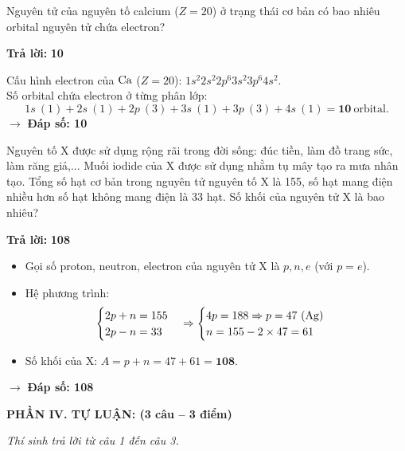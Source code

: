\documentclass[11pt,a4paper]{article}
\begin{document}
\begin{ex}%
Nguyên tử của nguyên tố calcium ($Z = 20$) ở trạng thái cơ bản có bao nhiêu orbital nguyên tử chứa electron?

\textbf{Trả lời: } \textbf{\color{hfRed}10}
\begin{loigiai}
Cấu hình electron của $\ce{Ca}$ ($Z = 20$): $1s^2 2s^2 2p^6 3s^2 3p^6 4s^2$.\\
Số orbital chứa electron ở từng phân lớp:
$$1s\ (1) + 2s\ (1) + 2p\ (3) + 3s\ (1) + 3p\ (3) + 4s\ (1) = \mathbf{10}\ \text{orbital}.$$
$\rightarrow$ \textbf{Đáp số: 10}
\end{loigiai}
\end{ex}

\begin{ex}%
Nguyên tố X được sử dụng rộng rãi trong đời sống: đúc tiền, làm đồ trang sức, làm răng giả,... Muối iodide của X được sử dụng nhằm tụ mây tạo ra mưa nhân tạo. Tổng số hạt cơ bản trong nguyên tử nguyên tố X là 155, số hạt mang điện nhiều hơn số hạt không mang điện là 33 hạt. Số khối của nguyên tử X là bao nhiêu?

\textbf{Trả lời: } \textbf{\color{hfRed}108}
\begin{loigiai}
\begin{itemize}[leftmargin=0.8cm]
\item Gọi số proton, neutron, electron của nguyên tử X là $p, n, e$ (với $p = e$).
\item Hệ phương trình:
$$\begin{cases} 2p + n = 155 \\ 2p - n = 33 \end{cases} \Rightarrow \begin{cases} 4p = 188 \Rightarrow p = 47\ (\ce{Ag}) \\ n = 155 - 2 \times 47 = 61 \end{cases}$$
\item Số khối của X: $A = p + n = 47 + 61 = \mathbf{108}$.
\end{itemize}
$\rightarrow$ \textbf{Đáp số: 108}
\end{loigiai}
\end{ex}

\vspace{6pt}
\noindent
\textbf{\large\color{mainGreen}PHẦN IV. TỰ LUẬN: (3 câu – 3 điểm)}

\textit{Thí sinh trả lời từ câu 1 đến câu 3.}
\vspace{4pt}
\end{document}
